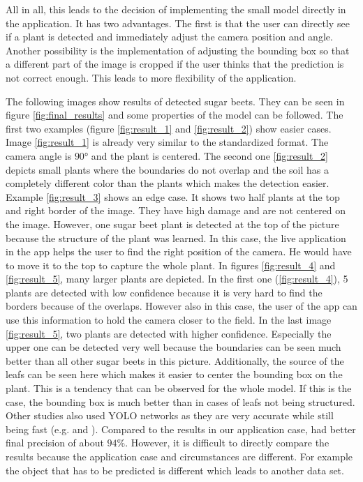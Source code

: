 All in all, this leads to the decision of implementing the small model directly in the application. It has two advantages. The first is that the user can directly see if a plant is detected and immediately adjust the camera position and angle. Another possibility is the implementation of adjusting the bounding box so that a different part of the image is cropped if the user thinks that the prediction is not correct enough. This leads to more flexibility of the application.

The following images show results of detected sugar beets. They can be seen in figure \ref{fig:final_results} and some properties of the model can be followed. The first two examples (figure \ref{fig:result_1} and \ref{fig:result_2}) show easier cases. Image \ref{fig:result_1} is already very similar to the standardized format. The camera angle is $ 90° $ and the plant is centered. The second one \ref{fig:result_2} depicts small plants where the boundaries do not overlap and the soil has a completely different color than the plants which makes the detection easier. Example \ref{fig:result_3} shows an edge case. It shows two half plants at the top and right border of the image. They have high damage and are not centered on the image. However, one sugar beet plant is detected at the top of the picture because the structure of the plant was learned. In this case, the live application in the app helps the user to find the right position of the camera. He would have to move it to the top to capture the whole plant. In figures \ref{fig:result_4} and \ref{fig:result_5}, many larger plants are depicted. In the first one (\ref{fig:result_4}), 5 plants are detected with low confidence because it is very hard to find the borders because of the overlaps. However also in this case, the user of the app can use this information to hold the camera closer to the field. In the last image \ref{fig:result_5}, two plants are detected with higher confidence. Especially the upper one can be detected very well because the boundaries can be seen much better than all other sugar beets in this picture. Additionally, the source of the leafs can be seen here which makes it easier to center the bounding box on the plant. This is a tendency that can be observed for the whole model. If this is the case, the bounding box is much better than in cases of leafs not being structured.\\

Other studies also used YOLO networks as they are very accurate while still being fast (e.g. \cite{sugar_beet_mechanical_damage} and \cite{apple_detection}). Compared to the results in our application case, \cite{sugar_beet_mechanical_damage} had better final precision of about $ 94\% $. However, it is difficult to directly compare the results because the application case and circumstances are different. For example the object that has to be predicted is different which leads to another data set. 

